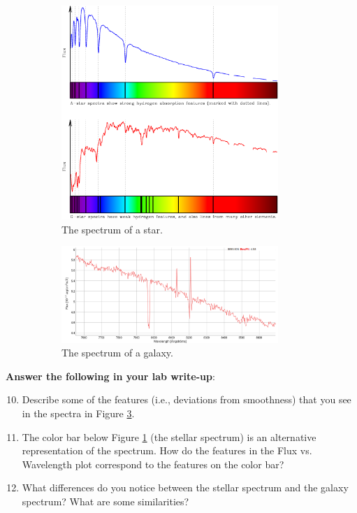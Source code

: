 \documentclass[11pt]{article}
\begin{document}
\begin{figure}[h!]
    \centering
    \begin{subfigure}[b]{0.75\textwidth}
        \centering
        \includegraphics[width=0.9\textwidth,trim={0cm 9.75cm 0cm 0cm},clip]{Images/spectrum.png}
        \caption{The spectrum of a star.}
        \label{fig:stellar_spec}
    \end{subfigure}
    \hfill
    \begin{subfigure}[b]{0.75\textwidth}
        \centering
        \includegraphics[width=0.9\textwidth,trim={0cm 0cm 0cm 1cm},clip]{Images/gal_spec.png}
        \caption{The spectrum of a galaxy.}
        \label{fig:gal_spec}
    \end{subfigure}
    \caption{}
    \label{fig:spec}
\end{figure}

\medskip
\textbf{Answer the following in your lab write-up}:
\begin{enumerate}
    \setcounter{enumi}{9}
    
    \item Describe some of the features (i.e., deviations from smoothness) that you see in the spectra in Figure \ref{fig:spec}.
    \item The color bar below Figure \ref{fig:stellar_spec} (the stellar spectrum) is an alternative representation of the spectrum. How do the features in the Flux vs. Wavelength plot correspond to the features on the color bar?
    \item What differences do you notice between the stellar spectrum and the galaxy spectrum? What are some similarities?
\end{enumerate}
\end{document}
